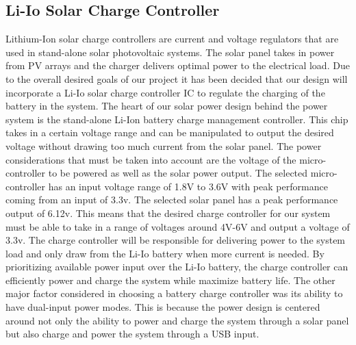 \subsection{Li-Io Solar Charge Controller}
Lithium-Ion solar charge controllers are current and voltage regulators that are used in stand-alone solar photovoltaic systems. The solar panel takes in power from PV arrays and the charger delivers optimal power to the electrical load. Due to the overall desired goals of our project it has been decided that our design will incorporate a Li-Io solar charge controller IC to regulate the charging of the battery in the system. The heart of our solar power design behind the power system is the stand-alone Li-Ion battery charge
management controller. This chip takes in a certain voltage range and can be manipulated to output the desired voltage without drawing too much current from the solar panel. The power considerations that must be taken into account are the voltage of the micro-controller to be powered as well as the solar power output. The selected micro-controller has an input voltage range of 1.8V to 3.6V with peak performance coming from an input of 3.3v. The selected solar panel has a peak performance output of 6.12v. This means that the desired charge controller for our system must be able to take in a range of voltages around 4V-6V and output a voltage of 3.3v. The charge controller will be responsible for delivering power to the system load and only draw from the Li-Io battery when more current is needed. By prioritizing available power input over the Li-Io battery, the charge controller can efficiently power and charge the system while maximize battery life. The other major factor considered in choosing a battery charge controller was its ability to have dual-input power modes. This is because the power design is centered around not only the ability to power and charge the system through a solar panel but also charge and power the system through a USB input.  
